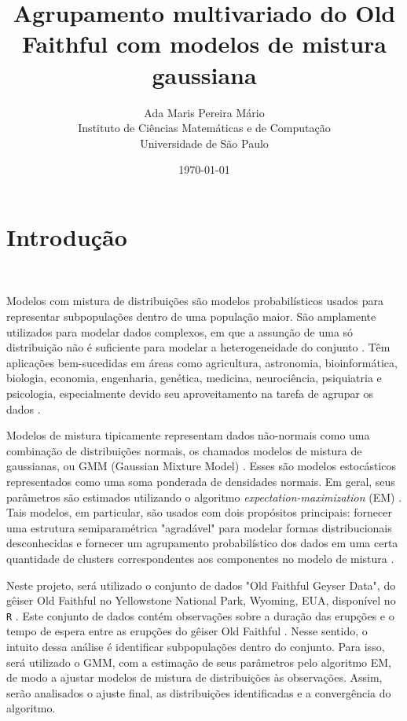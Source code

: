 \documentclass[12pt]{article}
\title{Agrupamento multivariado do Old Faithful com modelos de mistura gaussiana}
\author{{Ada Maris Pereira Mário}\\
Instituto de Ciências Matemáticas e de Computação\\ Universidade de São Paulo
}
\date{\today}
\begin{document}
\maketitle


\section{Introdução}

\

Modelos com mistura de distribuições são modelos probabilísticos usados para representar subpopulações dentro de uma população maior. São amplamente utilizados para modelar dados complexos, em que a assunção de uma só distribuição não é suficiente para modelar a heterogeneidade do conjunto \citep{mclachlan2000finite}. Têm aplicações bem-sucedidas em áreas como agricultura, astronomia, bioinformática, biologia, economia, engenharia, genética, medicina, neurociência, psiquiatria e psicologia, especialmente devido seu aproveitamento na tarefa de agrupar os dados \citep{mclachlan1988mixture}.

Modelos de mistura tipicamente representam dados não-normais como uma combinação de distribuições normais, os chamados modelos de mistura de gaussianas, ou GMM (Gaussian Mixture Model) \citep{prince2021analytic}. Esses são modelos estocásticos representados como uma soma ponderada de densidades normais. Em geral, seus parâmetros são estimados utilizando o algoritmo \textit{expectation-maximization} (EM) \citep{reynolds2009gaussian}. Tais modelos, em particular, são usados com dois propósitos principais: fornecer uma estrutura semiparamétrica "agradável" para modelar formas distribucionais desconhecidas e  fornecer um agrupamento probabilístico dos dados em uma certa quantidade de clusters correspondentes aos componentes no modelo de mistura \citep{mclachlan2014number}.

Neste projeto, será utilizado o conjunto de dados "Old Faithful Geyser Data", do gêiser Old Faithful no Yellowstone National Park, Wyoming, EUA, disponível no \texttt{R}  \citep{faithful}. Este conjunto de dados contém observações sobre a duração das erupções e o tempo de espera entre as erupções do gêiser Old Faithful \cite{azzalini1990look}. Nesse sentido, o intuito dessa análise é identificar subpopulações dentro do conjunto. Para isso, será utilizado o GMM, com a estimação de seus parâmetros pelo algoritmo EM, de modo a ajustar modelos de mistura de distribuições às observações. Assim, serão analisados o ajuste final, as distribuições identificadas e a convergência do algoritmo.
\end{document}
